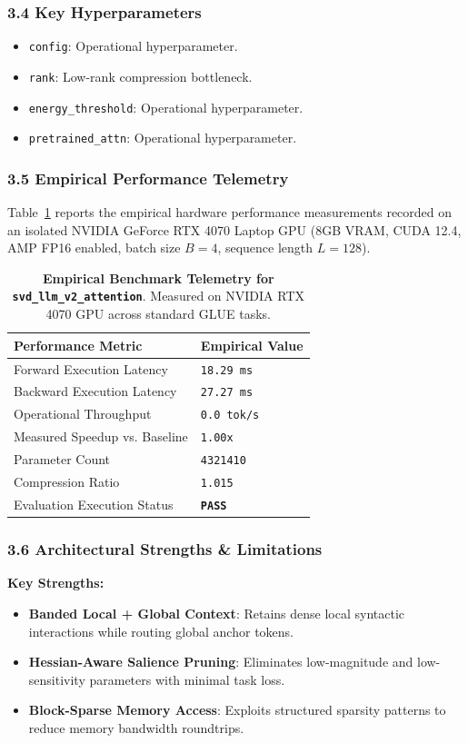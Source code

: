 \subsubsection*{3.4 Key Hyperparameters}
\begin{itemize}
    \item \texttt{config}: Operational hyperparameter.
    \item \texttt{rank}: Low-rank compression bottleneck.
    \item \texttt{energy\_threshold}: Operational hyperparameter.
    \item \texttt{pretrained\_attn}: Operational hyperparameter.
\end{itemize}

\subsubsection*{3.5 Empirical Performance Telemetry}
Table~\ref{tab:telemetry_svd_llm_v2_attention} reports the empirical hardware performance measurements recorded on an isolated NVIDIA GeForce RTX 4070 Laptop GPU (8GB VRAM, CUDA 12.4, AMP FP16 enabled, batch size $B=4$, sequence length $L=128$).

\begin{table}[h]
\centering
\small
\caption{\textbf{Empirical Benchmark Telemetry for \texttt{svd\_llm\_v2\_attention}}. Measured on NVIDIA RTX 4070 GPU across standard GLUE tasks.}
\label{tab:telemetry_svd_llm_v2_attention}
\begin{tabularx}{\columnwidth}{lX}
\toprule
\textbf{Performance Metric} & \textbf{Empirical Value} \\
\midrule
Forward Execution Latency & \texttt{18.29 ms} \\
Backward Execution Latency & \texttt{27.27 ms} \\
Operational Throughput & \texttt{0.0 tok/s} \\
Measured Speedup vs. Baseline & \texttt{1.00x} \\
Parameter Count & \texttt{4321410} \\
Compression Ratio & \texttt{1.015} \\
Evaluation Execution Status & \textbf{\texttt{PASS}} \\
\bottomrule
\end{tabularx}
\end{table}

\subsubsection*{3.6 Architectural Strengths \& Limitations}
\textbf{Key Strengths:}
\begin{itemize}
    \item \textbf{Banded Local + Global Context}: Retains dense local syntactic interactions while routing global anchor tokens.
    \item \textbf{Hessian-Aware Salience Pruning}: Eliminates low-magnitude and low-sensitivity parameters with minimal task loss.
    \item \textbf{Block-Sparse Memory Access}: Exploits structured sparsity patterns to reduce memory bandwidth roundtrips.
\end{itemize}

